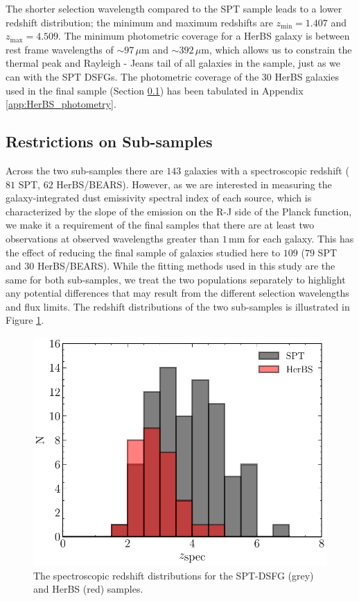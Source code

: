 The shorter selection wavelength compared to the SPT sample leads to a lower redshift distribution; the minimum and maximum redshifts are $z_{\textrm{min}} = 1.407$ and $z_{\textrm{max}} = 4.509$. The minimum photometric coverage for a HerBS galaxy is between rest frame wavelengths of $\sim 97\,\mu$m and $\sim 392\,\mu$m, which allows us to constrain the thermal peak and Rayleigh - Jeans tail of all galaxies in the sample, just as we can with the SPT DSFGs. The photometric coverage of the 30 HerBS galaxies used in the final sample (Section \ref{sec:restrictions_on_sample}) has been tabulated in Appendix \ref{app:HerBS_photometry}.

\subsection{Restrictions on Sub-samples}
\label{sec:restrictions_on_sample}

Across the two sub-samples there are $143$ galaxies with a spectroscopic redshift ($81$ SPT, $62$ HerBS/BEARS). However, as we are interested in measuring the galaxy-integrated dust emissivity spectral index of each source, which is characterized by the slope of the emission on the R-J side of the Planck function, we make it a requirement of the final samples that there are at least two observations at observed wavelengths greater than $1\,$mm for each galaxy. This has the effect of reducing the final sample of galaxies studied here to $109$ ($79$ SPT and $30$ HerBS/BEARS). While the fitting methods used in this study are the same for both sub-samples, we treat the two populations separately to highlight any potential differences that may result from the different selection wavelengths and flux limits. The redshift distributions of the two sub-samples is illustrated in Figure \ref{fig:spt_herbs_redshift}.

\begin{figure}
	\centering
	\includegraphics[width=0.8\columnwidth]{Figures/spt_herbs_redshift_distribution.pdf}
	\caption[Spectroscopic redshift distributions of HerBS and SPT-DSFG samples]{The spectroscopic redshift distributions for the SPT-DSFG (grey) and HerBS (red) samples.}
	\label{fig:spt_herbs_redshift}
\end{figure}

